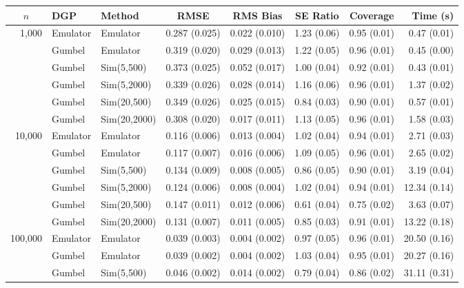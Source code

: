 \begin{table}[htbp]
\centering
\footnotesize
\begin{tabular}{@{}rllrrrrr@{}}
\toprule
\multicolumn{1}{c}{$n$} & \multicolumn{1}{l}{DGP} & \multicolumn{1}{l}{Method} & \multicolumn{1}{c}{RMSE} & \multicolumn{1}{c}{RMS Bias} & \multicolumn{1}{c}{SE Ratio} & \multicolumn{1}{c}{Coverage} & \multicolumn{1}{r}{Time (s)} \\
\midrule
\multirow{6}{*}{1,000} & Emulator & Emulator & 0.287 (0.025) & 0.022 (0.010) & 1.23 (0.06) & 0.95 (0.01) & 0.47 (0.01) \\
 & Gumbel & Emulator & 0.319 (0.020) & 0.029 (0.013) & 1.22 (0.05) & 0.96 (0.01) & 0.45 (0.00) \\
 & Gumbel & Sim(5,500) & 0.373 (0.025) & 0.052 (0.017) & 1.00 (0.04) & 0.92 (0.01) & 0.43 (0.01) \\
 & Gumbel & Sim(5,2000) & 0.339 (0.026) & 0.028 (0.014) & 1.16 (0.06) & 0.96 (0.01) & 1.37 (0.02) \\
 & Gumbel & Sim(20,500) & 0.349 (0.026) & 0.025 (0.015) & 0.84 (0.03) & 0.90 (0.01) & 0.57 (0.01) \\
 & Gumbel & Sim(20,2000) & 0.308 (0.020) & 0.017 (0.011) & 1.13 (0.05) & 0.96 (0.01) & 1.58 (0.03) \\
\midrule
\multirow{6}{*}{10,000} & Emulator & Emulator & 0.116 (0.006) & 0.013 (0.004) & 1.02 (0.04) & 0.94 (0.01) & 2.71 (0.03) \\
 & Gumbel & Emulator & 0.117 (0.007) & 0.016 (0.006) & 1.09 (0.05) & 0.96 (0.01) & 2.65 (0.02) \\
 & Gumbel & Sim(5,500) & 0.134 (0.009) & 0.008 (0.005) & 0.86 (0.05) & 0.90 (0.01) & 3.19 (0.04) \\
 & Gumbel & Sim(5,2000) & 0.124 (0.006) & 0.008 (0.004) & 1.02 (0.04) & 0.94 (0.01) & 12.34 (0.14) \\
 & Gumbel & Sim(20,500) & 0.147 (0.011) & 0.012 (0.006) & 0.61 (0.04) & 0.75 (0.02) & 3.63 (0.07) \\
 & Gumbel & Sim(20,2000) & 0.131 (0.007) & 0.011 (0.005) & 0.85 (0.03) & 0.91 (0.01) & 13.22 (0.18) \\
\midrule
\multirow{6}{*}{100,000} & Emulator & Emulator & 0.039 (0.003) & 0.004 (0.002) & 0.97 (0.05) & 0.96 (0.01) & 20.50 (0.16) \\
 & Gumbel & Emulator & 0.039 (0.002) & 0.004 (0.002) & 1.03 (0.04) & 0.95 (0.01) & 20.27 (0.16) \\
 & Gumbel & Sim(5,500) & 0.046 (0.002) & 0.014 (0.002) & 0.79 (0.04) & 0.86 (0.02) & 31.11 (0.31) \\

\end{tabular}
\end{table}
